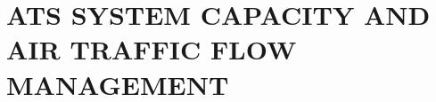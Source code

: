 
\chapterbegin

\section[ATS System Capacity and Air Traffic Flow Management]{ATS SYSTEM CAPACITY AND \\ AIR TRAFFIC FLOW MANAGEMENT}